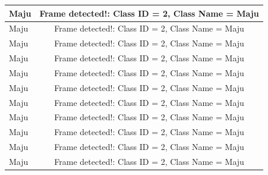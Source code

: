 \begin{longtable}{|l|c|}
  Maju           & Frame detected!: Class ID = 2, Class Name = Maju   \\ \hline
  Maju           & Frame detected!: Class ID = 2, Class Name = Maju   \\ \hline
  Maju           & Frame detected!: Class ID = 2, Class Name = Maju   \\ \hline
  Maju           & Frame detected!: Class ID = 2, Class Name = Maju   \\ \hline
  Maju           & Frame detected!: Class ID = 2, Class Name = Maju   \\ \hline
  Maju           & Frame detected!: Class ID = 2, Class Name = Maju   \\ \hline
  Maju           & Frame detected!: Class ID = 2, Class Name = Maju   \\ \hline
  Maju           & Frame detected!: Class ID = 2, Class Name = Maju   \\ \hline
  Maju           & Frame detected!: Class ID = 2, Class Name = Maju   \\ \hline
  Maju           & Frame detected!: Class ID = 2, Class Name = Maju   \\ \hline
  Maju           & Frame detected!: Class ID = 2, Class Name = Maju   \\ \hline
\end{longtable}

